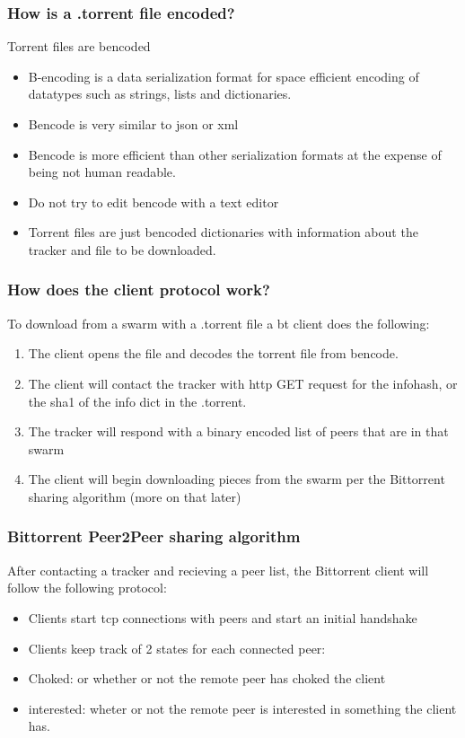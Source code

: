 \documentclass{beamer}
\begin{document}
\begin{frame}
\frametitle{How is a .torrent file encoded?}
\begin{block}{Torrent files are bencoded}
\begin{itemize}
\item B-encoding is a data serialization format for space efficient encoding of datatypes such as strings, lists and dictionaries.
\item Bencode is very similar to json or xml
\item Bencode is more efficient than other serialization formats at the expense of being not human readable.
\item Do not try to edit bencode with a text editor
\item Torrent files are just bencoded dictionaries with information about the tracker and file to be downloaded.
\end{itemize}
\end{block}
\end{frame}

\begin{frame}
\frametitle{How does the client protocol work?}
\begin{block}{To download from a swarm with a .torrent file a bt client does the following:}
\begin{enumerate}
\item The client opens the file and decodes the torrent file from bencode.
\item The client will contact the tracker with http GET request for the infohash, or the sha1 of the info dict in the .torrent.
\item The tracker will respond with a binary encoded list of peers that are in that swarm
\item The client will begin downloading pieces from the swarm per the Bittorrent sharing algorithm (more on that later)
\end{enumerate}
\end{block}
\end{frame}

\begin{frame}
\frametitle{Bittorrent Peer2Peer sharing algorithm}
\begin{block}{After contacting a tracker and recieving a peer list, the Bittorrent client will follow the following protocol:}
\begin{itemize}
\item Clients start tcp connections with peers and start an initial handshake
\item Clients keep track of 2 states for each connected peer:
\item Choked: or whether or not the remote peer has choked the client
\item interested: wheter or not the remote peer is interested in something the client has. 
\end{itemize}
\end{block}
\end{frame}
\end{document}
